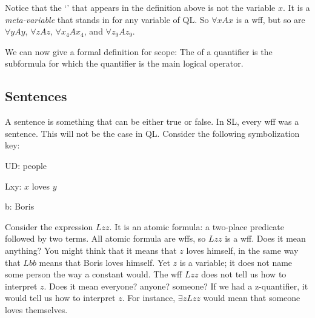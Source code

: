 Notice that the `' that appears in the definition above is not the variable $x$. It is a \emph{meta-variable} that stands in for any variable of QL. So $\forall xAx$ is a wff, but so are $\forall yAy$, $\forall zAz$, $\forall x_4Ax_4$, and $\forall z_9Az_9$.

We can now give a formal definition for scope: The  of a quantifier is the subformula for which the quantifier is the main logical operator. 









\subsection{Sentences}

A {sentence} is something that can be either true or false. In SL, every wff was a sentence. This will not be the case in QL. Consider the following symbolization key:
\begin{ekey}
\item[UD:] people
\item[Lxy:] $x$ loves $y$
\item[b:] Boris
\end{ekey}
Consider the expression $Lzz$. It is an atomic formula: a two-place predicate followed by two terms. All atomic formula are wffs, so $Lzz$ is a wff. Does it mean anything? You might think that it means that $z$ loves himself, in the same way that $Lbb$ means that Boris loves himself. Yet $z$ is a variable; it does not name some person the way a constant would. The wff $Lzz$ does not tell us how to interpret $z$. Does it mean everyone? anyone? someone? If we had a z-quantifier, it would tell us how to interpret $z$. For instance, $\exists zLzz$ would mean that someone loves themselves.

